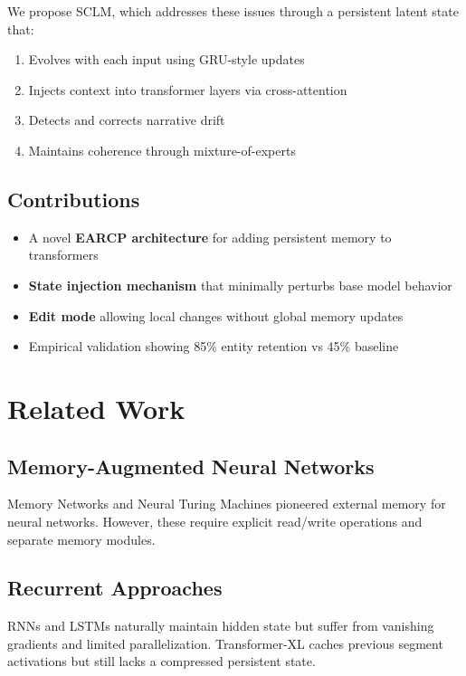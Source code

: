 \documentclass[11pt,a4paper]{article}
\begin{document}
We propose SCLM, which addresses these issues through a persistent latent state that:
\begin{enumerate}
    \item Evolves with each input using GRU-style updates
    \item Injects context into transformer layers via cross-attention
    \item Detects and corrects narrative drift
    \item Maintains coherence through mixture-of-experts
\end{enumerate}

\subsection{Contributions}

\begin{itemize}
    \item A novel \textbf{EARCP architecture} for adding persistent memory to transformers
    \item \textbf{State injection mechanism} that minimally perturbs base model behavior
    \item \textbf{Edit mode} allowing local changes without global memory updates
    \item Empirical validation showing 85\% entity retention vs 45\% baseline
\end{itemize}

\section{Related Work}

\subsection{Memory-Augmented Neural Networks}

Memory Networks \cite{weston2015memory} and Neural Turing Machines \cite{graves2014neural} pioneered external memory for neural networks. However, these require explicit read/write operations and separate memory modules.

\subsection{Recurrent Approaches}

RNNs and LSTMs naturally maintain hidden state but suffer from vanishing gradients and limited parallelization. Transformer-XL \cite{dai2019transformer} caches previous segment activations but still lacks a compressed persistent state.
\end{document}
